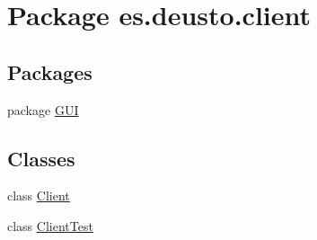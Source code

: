 \hypertarget{namespacees_1_1deusto_1_1client}{}\section{Package es.\+deusto.\+client}
\label{namespacees_1_1deusto_1_1client}
\subsection*{Packages}
\begin{DoxyCompactItemize}
\item 
package \hyperlink{namespacees_1_1deusto_1_1client_1_1_g_u_i}{G\+UI}
\end{DoxyCompactItemize}
\subsection*{Classes}
\begin{DoxyCompactItemize}
\item 
class \hyperlink{classes_1_1deusto_1_1client_1_1_client}{Client}
\item 
class \hyperlink{classes_1_1deusto_1_1client_1_1_client_test}{Client\+Test}
\end{DoxyCompactItemize}
